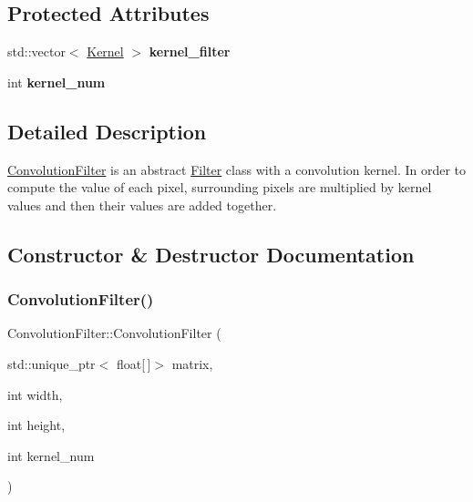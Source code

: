 \subsection*{Protected Attributes}
\begin{DoxyCompactItemize}
\item 
\mbox{\label{classConvolutionFilter_ac78d47b9a00d813a527e48ccce62e7dc}} 
std\+::vector$<$ \hyperlink{classKernel}{Kernel} $>$ {\bfseries kernel\+\_\+filter}
\item 
\mbox{\label{classConvolutionFilter_aea4c4b00b3a15b3ba75ae2ce9ce141a2}} 
int {\bfseries kernel\+\_\+num}
\end{DoxyCompactItemize}


\subsection{Detailed Description}
\hyperlink{classConvolutionFilter}{Convolution\+Filter} is an abstract \hyperlink{classFilter}{Filter} class with a convolution kernel. In order to compute the value of each pixel, surrounding pixels are multiplied by kernel values and then their values are added together. 

\subsection{Constructor \& Destructor Documentation}
\mbox{\label{classConvolutionFilter_af9356cfa9f768fbf7c97b51e7867ce12}} 
\subsubsection{\texorpdfstring{Convolution\+Filter()}{ConvolutionFilter()}}
{\footnotesize\ttfamily Convolution\+Filter\+::\+Convolution\+Filter (\begin{DoxyParamCaption}\item[{std\+::unique\+\_\+ptr$<$ float\mbox{[}$\,$\mbox{]}$>$}]{matrix,  }\item[{int}]{width,  }\item[{int}]{height,  }\item[{int}]{kernel\+\_\+num }\end{DoxyParamCaption})}



